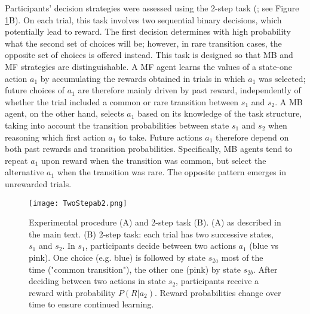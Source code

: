 \documentclass[11pt]{article} %
\begin{document}
Participants' decision strategies were assessed using the 2-step task (\cite{daw_model-based_2011}; see Figure \ref{TwoStep}B). On each trial, this task involves two sequential binary decisions, which potentially lead to reward. The first decision determines with high probability what the second set of choices will be; however, in rare transition cases, the opposite set of choices is offered instead. This task is designed so that MB and MF strategies are distinguishable. A MF agent learns the values of a state-one action $a_{1}$ by accumulating the rewards obtained in trials in which $a_{1}$ was selected; future choices of $a_{1}$ are therefore mainly driven by past reward, independently of whether the trial included a common or rare transition between $s_{1}$ and $s_{2}$. A MB agent, on the other hand, selects $a_{1}$ based on its knowledge of the task structure, taking into account the transition probabilities between state $s_{1}$ and $s_{2}$ when reasoning which first action $a_{1}$ to take. Future actions $a_{1}$ therefore depend on both past rewards and transition probabilities. Specifically, MB agents tend to repeat $a_{1}$ upon reward when the transition was common, but select the alternative $a_{1}$ when the transition was rare. The opposite pattern emerges in unrewarded trials.
%
\begin{figure}
	\texttt{[image: TwoStepab2.png]}
	\caption{Experimental procedure (A) and 2-step task (B). (A) as described in the main text. (B) 2-step task: each trial has two successive states, $s_{1}$ and $s_{2}$. In $s_{1}$, participants decide between two actions $a_{1}$ (blue vs pink). One choice (e.g. blue) is followed by state $s_{2a}$ most of the time ("common transition"), the other one (pink) by state $s_{2b}$. After deciding between two actions in state $s_{2}$, participants receive a reward with probability $P(R|a_{2})$. Reward probabilities change over time to ensure continued learning.}
	\label{TwoStep}
\end{figure}
%
\end{document}
